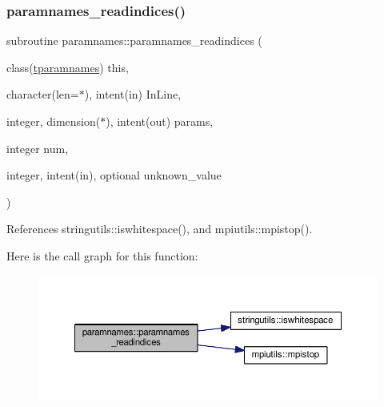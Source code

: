 \subsubsection{\texorpdfstring{paramnames\+\_\+readindices()}{paramnames\_readindices()}}
{\footnotesize\ttfamily subroutine paramnames\+::paramnames\+\_\+readindices (\begin{DoxyParamCaption}\item[{class(\mbox{\hyperlink{structparamnames_1_1tparamnames}{tparamnames}})}]{this,  }\item[{character(len=$\ast$), intent(in)}]{In\+Line,  }\item[{integer, dimension($\ast$), intent(out)}]{params,  }\item[{integer}]{num,  }\item[{integer, intent(in), optional}]{unknown\+\_\+value }\end{DoxyParamCaption})\hspace{0.3cm}{\ttfamily [private]}}



References stringutils\+::iswhitespace(), and mpiutils\+::mpistop().

Here is the call graph for this function\+:
\nopagebreak
\begin{figure}[H]
\begin{center}
\leavevmode
\includegraphics[width=350pt]{namespaceparamnames_a1f770d70e7cc5a35f6a617f5ae2f4c07_cgraph}
\end{center}
\end{figure}
\mbox{\label{namespaceparamnames_ad3d4b6760fe5b48b0754c2d2f7f0b909}} 
